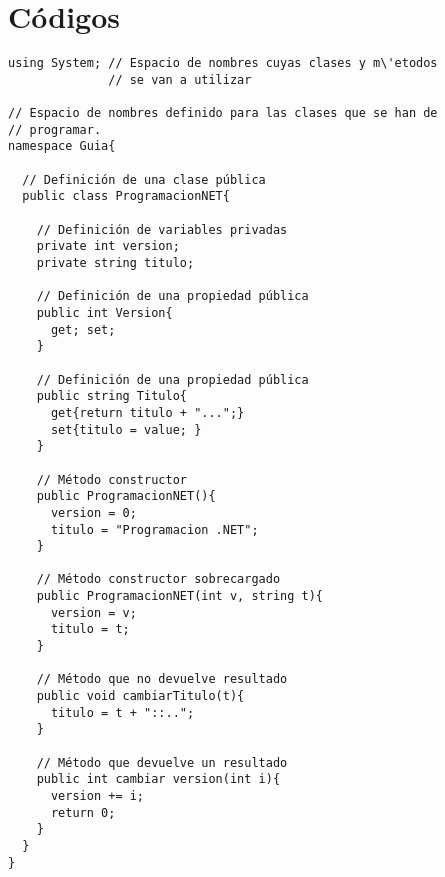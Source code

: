 \documentclass[12pt,spanish,lettersize]{article}
\begin{document}
\section{C\'odigos}
\begin{verbatim}
using System; // Espacio de nombres cuyas clases y m\'etodos
              // se van a utilizar

// Espacio de nombres definido para las clases que se han de
// programar.
namespace Guia{

  // Definición de una clase pública 
  public class ProgramacionNET{

    // Definición de variables privadas
    private int version;
    private string titulo;

    // Definición de una propiedad pública
    public int Version{
      get; set;
    }

    // Definición de una propiedad pública
    public string Titulo{
      get{return titulo + "...";}
      set{titulo = value; }
    }

    // Método constructor
    public ProgramacionNET(){
      version = 0;
      titulo = "Programacion .NET";
    }

    // Método constructor sobrecargado
    public ProgramacionNET(int v, string t){
      version = v;
      titulo = t;
    }

    // Método que no devuelve resultado
    public void cambiarTitulo(t){
      titulo = t + "::..";
    }

    // Método que devuelve un resultado
    public int cambiar version(int i){
      version += i;
      return 0;
    }
  }
}
\end{verbatim}
\end{document}
